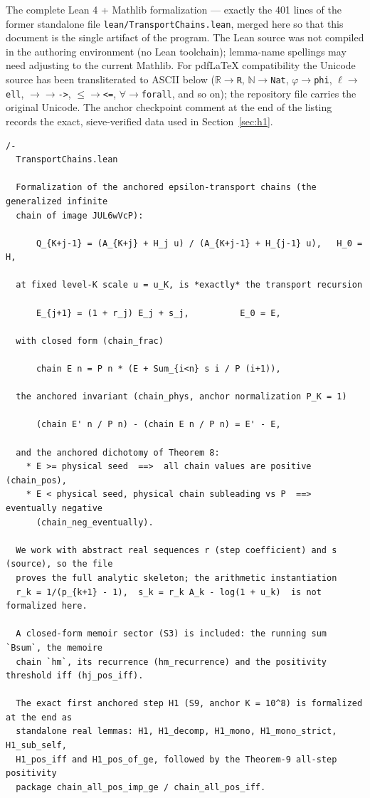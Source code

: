\documentclass[11pt]{article}
\theoremstyle{remark}
\begin{document}
The complete Lean 4 + Mathlib formalization --- exactly the 401 lines of the
former standalone file \texttt{lean/TransportChains.lean}, merged here so
that this document is the single artifact of the program. The Lean source
was not compiled in the authoring environment (no Lean toolchain);
lemma-name spellings may need adjusting to the current Mathlib. For pdfLaTeX
compatibility the Unicode source has been transliterated to ASCII below
($\mathbb{R}\to$\texttt{R}, $\mathbb{N}\to$\texttt{Nat},
$\varphi\to$\texttt{phi}, $\ell\to$\texttt{ell}, $\to\to$\texttt{->},
$\le\to$\texttt{<=}, $\forall\to$\texttt{forall}, and so on); the
repository file carries the original Unicode. The anchor checkpoint comment
at the end of the listing records the exact, sieve-verified data used in
Section~\ref{sec:h1}.

\begin{verbatim}
/-
  TransportChains.lean

  Formalization of the anchored epsilon-transport chains (the generalized infinite
  chain of image JUL6wVcP):

      Q_{K+j-1} = (A_{K+j} + H_j u) / (A_{K+j-1} + H_{j-1} u),   H_0 = H,

  at fixed level-K scale u = u_K, is *exactly* the transport recursion

      E_{j+1} = (1 + r_j) E_j + s_j,          E_0 = E,

  with closed form (chain_frac)

      chain E n = P n * (E + Sum_{i<n} s i / P (i+1)),

  the anchored invariant (chain_phys, anchor normalization P_K = 1)

      (chain E' n / P n) - (chain E n / P n) = E' - E,

  and the anchored dichotomy of Theorem 8:
    * E >= physical seed  ==>  all chain values are positive            (chain_pos),
    * E < physical seed, physical chain subleading vs P  ==>  eventually negative
      (chain_neg_eventually).

  We work with abstract real sequences r (step coefficient) and s (source), so the file
  proves the full analytic skeleton; the arithmetic instantiation
  r_k = 1/(p_{k+1} - 1),  s_k = r_k A_k - log(1 + u_k)  is not formalized here.

  A closed-form memoir sector (S3) is included: the running sum `Bsum`, the memoire
  chain `hm`, its recurrence (hm_recurrence) and the positivity threshold iff (hj_pos_iff).

  The exact first anchored step H1 (S9, anchor K = 10^8) is formalized at the end as
  standalone real lemmas: H1, H1_decomp, H1_mono, H1_mono_strict, H1_sub_self,
  H1_pos_iff and H1_pos_of_ge, followed by the Theorem-9 all-step positivity
  package chain_all_pos_imp_ge / chain_all_pos_iff.


\end{verbatim}
\end{document}
